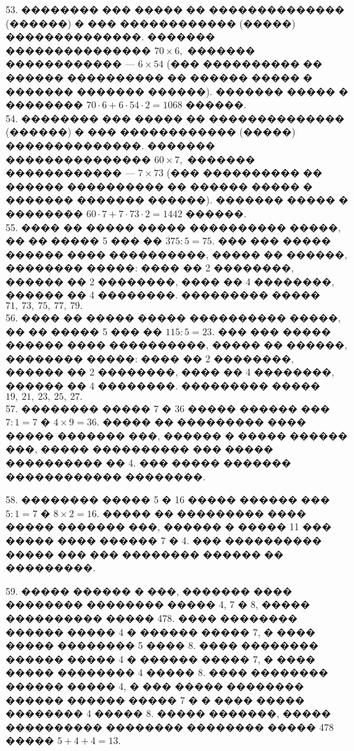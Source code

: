 \documentclass[12pt]{article}
\begin{document}
53. �������� ��� ����� �� �������������� (������) � ��� ������������ (�����) ��������������. ������� ��������������� $70\times6,$ ������� ������������ --- $6\times54$ (��� ���������� �� ������ ���������� �� ������ ����� � ������� ������� ������). ������� ����� � �������� $70\cdot6+6\cdot54\cdot2=1068$ ������.\\
54. �������� ��� ����� �� �������������� (������) � ��� ������������ (�����) ��������������. ������� ��������������� $60\times7,$ ������� ������������ --- $7\times73$ (��� ���������� �� ������ ���������� �� ������ ����� � ������� ������� ������). ������� ����� � �������� $60\cdot7+7\cdot73\cdot2=1442$ ������.\\
55. ���� �� ����� ����� ���������� �����, �� �� ����� 5 ��� �� $375:5=75.$ ��� ��� ����� ������ ���� ����������, ����� �� ������, �������� �����: ���� �� 2 ��������, ������ �� 2 ��������, ���� �� 4 ��������, ������ �� 4 ��������. ��������� ����� $71,\ 73,\ 75,\ 77,\ 79.$\\
56. ���� �� ����� ����� ���������� �����, �� �� ����� 5 ��� �� $115:5=23.$ ��� ��� ����� ������ ���� ����������, ����� �� ������, �������� �����: ���� �� 2 ��������, ������ �� 2 ��������, ���� �� 4 ��������, ������ �� 4 ��������. ��������� ����� $19,\ 21,\ 23,\ 25,\ 27.$\\
57. �������� ����� 7 � 36 ����� ������ ��� $7:1=7$ � $4\times9=36.$ ����� �� ��������� ���� ����� ������� ���, ������ � ����� ������ ���, ����� ���������� ��� ����� ���������� �� 4. ��� ����� ������� ������������ ��������.
\begin{center}
\begin{figure}[ht!]
\end{figure}
\end{center}
58. �������� ����� 5 � 16 ����� ������ ��� $5:1=7$ � $8\times2=16.$ ����� �� ��������� ���� ����� ������� ���, ������ � ����� 11 ��� ����� ���� ������ 7 � 4. ��� ���������� ����� ��� ��� �������� ������ �� ���������.
\begin{center}
\begin{figure}[ht!]
\end{figure}
\end{center}
59. ����� ������ � ���, ������� ���� �������� �������� ����� 4, 7 � 8, ����� ���������� ����� 478. ���� �������� ������ ����� 4 � ������ ����� 7, � ���� ����� �������� 5 ���� 8. ���� �������� ������ ����� 4 � ������ ����� 7, � ���� ����� �������� 4 ����� 8. ���� �������� ������ ����� 4, � ��� ����� �������� ������ ������ ����� 7 � � ���� ����� �������� 4 ����� 8. ����� �������, ����� ���������� �������� �������� ����� 478 ����� $5+4+4=13.$\\
\end{document}
